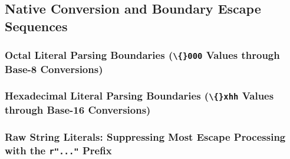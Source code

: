 \subsection{Native Conversion and Boundary Escape Sequences}
\subsubsection{Octal Literal Parsing Boundaries (\texttt{\textbackslash\{\}000} Values through Base-8 Conversions)}
\subsubsection{Hexadecimal Literal Parsing Boundaries (\texttt{\textbackslash\{\}xhh} Values through Base-16 Conversions)}
\subsubsection{Raw String Literals: Suppressing Most Escape Processing with the \texttt{r"..."} Prefix}
